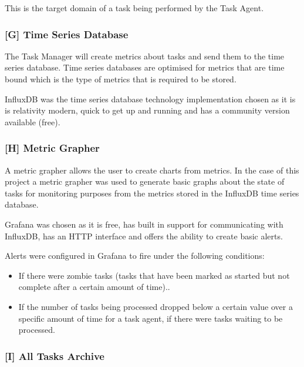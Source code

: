 \documentclass{mscreport}
\begin{document}
This is the target domain of a task being performed by the Task Agent.

\subsubsection{[G] Time Series Database}

The Task Manager will create metrics about tasks and send them to the time series database. Time series databases are optimised for metrics that are time bound which is the type of metrics that is required to be stored. 

\vspace{0.3cm} \noindent
InfluxDB was the time series database technology implementation chosen as it is is relativity modern, quick to get up and running and has a community version available (free).

\subsubsection{[H] Metric Grapher}

A metric grapher allows the user to create charts from metrics. In the case of this project a metric grapher was used to generate basic graphs about the state of tasks for monitoring purposes from the metrics stored in the InfluxDB time series database.

\vspace{0.3cm} \noindent
Grafana was chosen as it is free, has built in support for communicating with InfluxDB, has an HTTP interface and offers the ability to create basic alerts.

\vspace{0.3cm} \noindent
Alerts were configured in Grafana to fire under the following conditions:

\begin{itemize}
	\setlength\itemsep{0.1em}
    \item If there were zombie tasks (tasks that have been marked as started but not complete after a certain amount of time)..
    \item If the number of tasks being processed dropped below a certain value over a specific amount of time for a task agent, if there were tasks waiting to be processed.
\end{itemize}

\subsubsection{[I] All Tasks Archive}
\end{document}
